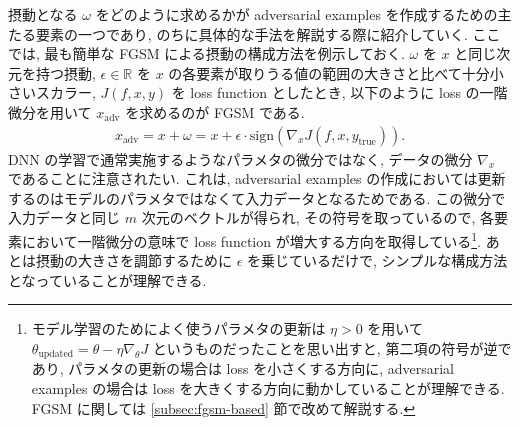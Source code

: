 摂動となる $\omega$ をどのように求めるかが adversarial examples を作成するための主たる要素の一つであり, のちに具体的な手法を解説する際に紹介していく.
ここでは, 最も簡単な FGSM による摂動の構成方法を例示しておく.
$\omega$ を $x$ と同じ次元を持つ摂動, $\epsilon \in \mathbb{R}$ を $x$ の各要素が取りうる値の範囲の大きさと比べて十分小さいスカラー, $J(f, x, y)$ を loss function としたとき, 以下のように loss の一階微分を用いて $x_{\text{adv}}$ を求めるのが FGSM である.
%
\begin{eqnarray}
x_{\text{adv}} = x + \omega = x + \epsilon \cdot \text{sign} ( \nabla_x J (f, x, y_{\text{true}}) ).
\label{eq:adv-fgsm}
\end{eqnarray}
%
DNN の学習で通常実施するようなパラメタの微分ではなく, データの微分 $\nabla_x$ であることに注意されたい.
これは, adversarial examples の作成においては更新するのはモデルのパラメタではなくて入力データとなるためである.
この微分で入力データと同じ $m$ 次元のベクトルが得られ, その符号を取っているので, 各要素において一階微分の意味で loss function が増大する方向を取得している\footnote{
モデル学習のためによく使うパラメタの更新は $\eta > 0$ を用いて $\theta_{\text{updated}} = \theta - \eta \nabla_\theta J$ というものだったことを思い出すと, 第二項の符号が逆であり, パラメタの更新の場合は loss を小さくする方向に, adversarial examples の場合は loss を大きくする方向に動かしていることが理解できる.
FGSM に関しては \ref{subsec:fgsm-based} 節で改めて解説する.
}.
あとは摂動の大きさを調節するために $\epsilon$ を乗じているだけで, シンプルな構成方法となっていることが理解できる.

